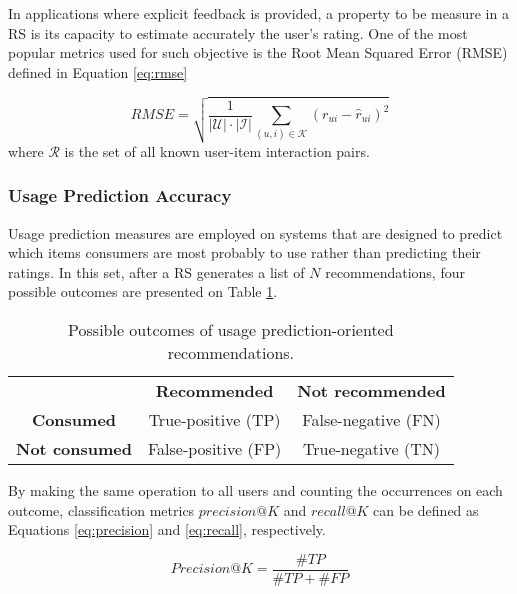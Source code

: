 In applications where explicit feedback is provided, a property to be measure in a RS is its capacity to estimate accurately the user's rating. One of the most popular metrics used for such objective is the Root Mean Squared Error (RMSE)  defined in Equation \ref{eq:rmse}

\begin{equation}
\label{eq:rmse}
    RMSE = \sqrt{\frac{1}{|\mathcal{U}| \cdot |\mathcal{I}|}\sum_{(u,i) \in \mathcal{K}}(r_{ui} - \hat{r}_{ui})^2}
\end{equation} where $\mathcal{R}$ is the set of all known user-item interaction pairs.

\subsubsection{Usage Prediction Accuracy}

Usage prediction measures are employed on systems that are designed to predict which items consumers are most probably to use rather than predicting their ratings. In this set, after a RS generates a list of $N$ recommendations, four possible outcomes are presented on Table \ref{tab:usage_table}.

\begin{table}[h]
	\centering
	\begin{tabular}{@{}ccc@{}}
		& \textbf{Recommended}                     & \textbf{Not recommended}                 \\ 
		\multicolumn{1}{c|}{\textbf{Consumed}}     & \multicolumn{1}{c|}{True-positive (TP)}  & \multicolumn{1}{c|}{False-negative (FN)} \\ 
		\multicolumn{1}{c|}{\textbf{Not consumed}} & \multicolumn{1}{c|}{False-positive (FP)} & \multicolumn{1}{c|}{True-negative (TN)}  \\ 
	\end{tabular}
	\caption{Possible outcomes of usage prediction-oriented recommendations.}
	\label{tab:usage_table}
\end{table}

By making the same operation to all users and counting the occurrences on each outcome, classification metrics $precision@K$ and $recall@K$ can be defined as Equations \ref{eq:precision} and \ref{eq:recall}, respectively.

\begin{equation}
\label{eq:precision}
Precision@K = \frac{\#TP}{\#TP + \#FP}
\end{equation}

